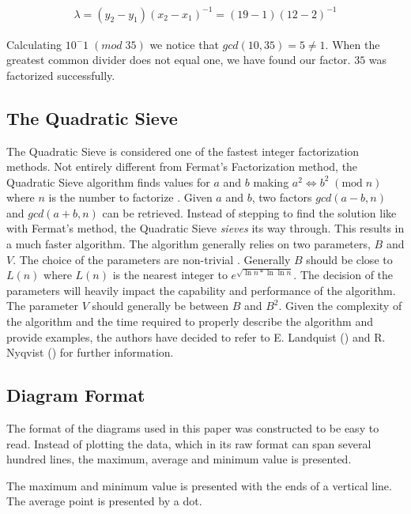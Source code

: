 \begin{equation*}
    \begin{array}{l}
        \lambda = (y_2 - y_1)(x_2 - x_1)^{-1} = (19-1)(12-2)^{-1}
    \end{array}
\end{equation*}

Calculating $10^-1\;(mod\;35)$ we notice that $gcd(10,35)=5≠1$. When the greatest common divider does not equal one, we have found our factor. $35$ was factorized successfully.

\subsection{The Quadratic Sieve}

The Quadratic Sieve is considered one of the fastest integer factorization methods. Not entirely different from Fermat's Factorization method, the Quadratic Sieve algorithm finds values for $a$ and $b$ making $a^2\iff b^2\;(\text{mod}\;n)$ where $n$ is the number to factorize \cite{quadraticSieve}. Given $a$ and $b$, two factors $gcd(a-b, n)$ and $gcd(a+b, n)$ can be retrieved. Instead of stepping to find the solution like with Fermat's method, the Quadratic Sieve \textit{sieves} its way through. This results in a much faster algorithm. The algorithm generally relies on two parameters, $B$ and $V$. The choice of the parameters are non-trivial \cite{Cryptography101}. Generally $B$ should be close to $L(n)$ where $L(n)$ is the nearest integer to $e^\sqrt{\ln{n}*\ln{\ln{n}}}$. The decision of the parameters will heavily impact the capability and performance of the algorithm. The parameter $V$ should generally be between $B$ and $B^2$. Given the complexity of the algorithm and the time required to properly describe the algorithm and provide examples, the authors have decided to refer to E. Landquist (\cite{quadraticSieve}) and R. Nyqvist (\cite{Cryptography101}) for further information.

\subsection{Diagram Format}
The format of the diagrams used in this paper was constructed to be easy to read. Instead of plotting the data, which in its raw format can span several hundred lines, the maximum, average and minimum value is presented.
\begin{figure}[H]
    \centering
    
\end{figure}
The maximum and minimum value is presented with the ends of a vertical line. The average point is presented by a dot.

